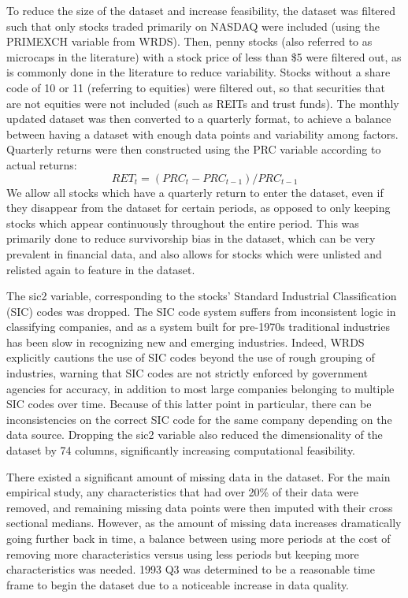 \documentclass{article}
\begin{document}
To reduce the size of the dataset and increase feasibility, the dataset was filtered such that only stocks traded primarily on NASDAQ were included (using the PRIMEXCH variable from WRDS). Then, penny stocks (also referred to as microcaps in the literature) with a stock price of less than \$5 were filtered out, as is commonly done in the literature to reduce variability. Stocks without a share code of 10 or 11 (referring to equities) were filtered out, so that securities that are not equities were not included (such as REITs and trust funds). The monthly updated dataset was then converted to a quarterly format, to achieve a balance between having a dataset with enough data points and variability among factors. Quarterly returns were then constructed using the PRC variable according to actual returns:
\begin{equation}
RET_t = (PRC_t - PRC_{t-1})/PRC_{t-1}
\end{equation}
We allow all stocks which have a quarterly return to enter the dataset, even if they disappear from the dataset for certain periods, as opposed to only keeping stocks which appear continuously throughout the entire period. This was primarily done to reduce survivorship bias in the dataset, which can be very prevalent in financial data, and also allows for stocks which were unlisted and relisted again to feature in the dataset. 

The sic2 variable, corresponding to the stocks' Standard Industrial Classification (SIC) codes was dropped. The SIC code system suffers from inconsistent logic in classifying companies, and as a system built for pre-1970s traditional industries has been slow in recognizing new and emerging industries. Indeed, WRDS explicitly cautions the use of SIC codes beyond the use of rough grouping of industries, warning that SIC codes are not strictly enforced by government agencies for accuracy, in addition to most large companies belonging to multiple SIC codes over time. Because of this latter point in particular, there can be inconsistencies on the correct SIC code for the same company depending on the data source. Dropping the sic2 variable also reduced the dimensionality of the dataset by 74 columns, significantly increasing computational feasibility.

There existed a significant amount of missing data in the dataset. For the main empirical study, any characteristics that had over 20\% of their data were removed, and remaining missing data points were then imputed with their cross sectional medians. However, as the amount of missing data increases dramatically going further back in time, a balance between using more periods at the cost of removing more characteristics versus using less periods but keeping more characteristics was needed. 1993 Q3 was determined to be a reasonable time frame to begin the dataset due to a noticeable increase in data quality.
\end{document}
